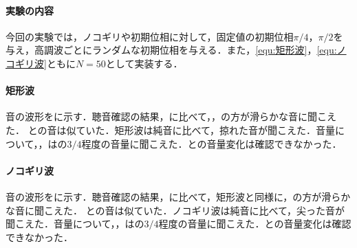 \paragraph{実験の内容}今回の実験では，ノコギリや初期位相に対して，固定値の初期位相\(\pi/4\)，\(\pi/2\)を与え，高調波ごとにランダムな初期位相を与える．また，\eqref{equ:矩形波}，\eqref{equ:ノコギリ波}ともに\(N=50\)として実装する．
\result
\paragraph{矩形波}
音の波形をに示す．聴音確認の結果，に比べて，，の方が滑らかな音に聞こえた．
との音は似ていた．矩形波は純音に比べて，掠れた音が聞こえた．音量について，，はの\(3/4\)程度の音量に聞こえた．との音量変化は確認できなかった．
\paragraph{ノコギリ波}
音の波形をに示す．聴音確認の結果，に比べて，矩形波と同様に，の方が滑らかな音に聞こえた．
との音は似ていた．ノコギリ波は純音に比べて，尖った音が聞こえた．音量について，，はの\(3/4\)程度の音量に聞こえた．との音量変化は確認できなかった．
